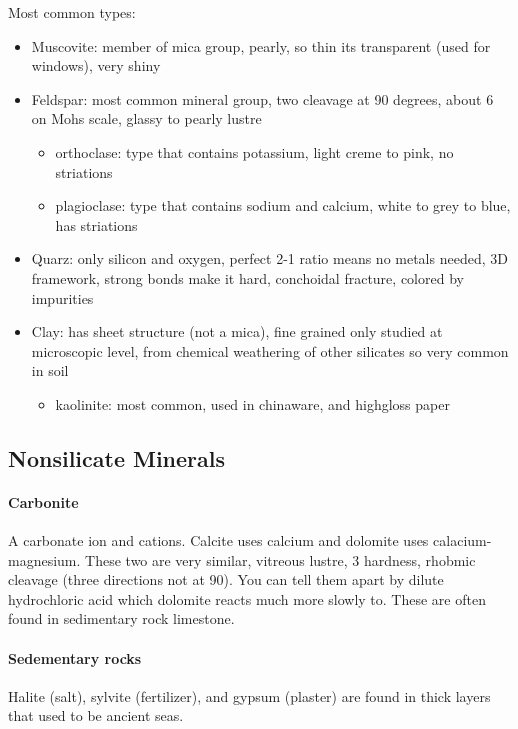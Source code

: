\documentclass{article}
\begin{document}
Most common types:
\begin{itemize}
    \item Muscovite: member of mica group, pearly, so thin its transparent (used for windows), very shiny
    \item Feldspar: most common mineral group, two cleavage at 90 degrees, about 6 on Mohs scale, glassy to pearly lustre
    \begin{itemize}
        \item orthoclase: type that contains potassium, light creme to pink, no striations
        \item plagioclase: type that contains sodium and calcium, white to grey to blue, has striations
    \end{itemize}
    \item Quarz: only silicon and oxygen, perfect 2-1 ratio means no metals needed, 3D framework, strong bonds make it hard, conchoidal fracture, colored by impurities
    \item Clay: has sheet structure (not a mica), fine grained only studied at microscopic level, from chemical weathering of other silicates so very common in soil
    \begin{itemize}
        \item kaolinite: most common, used in chinaware, and highgloss paper
    \end{itemize}
\end{itemize}


\subsection*{Nonsilicate Minerals} %
\label{sub:nonsilicate_minerals}
\paragraph{Carbonite} %
\label{par:carbonite}
A carbonate ion and cations. Calcite uses calcium and dolomite uses calacium-magnesium. These two are very similar, vitreous lustre, 3 hardness, rhobmic cleavage (three directions not at 90). You can tell them apart by dilute hydrochloric acid which dolomite reacts much more slowly to. These are often found in sedimentary rock limestone.

\paragraph{Sedementary rocks} %
\label{par:sedementary_rocks}
Halite (salt), sylvite (fertilizer), and gypsum (plaster) are found in thick layers that used to be ancient seas.
\end{document}
